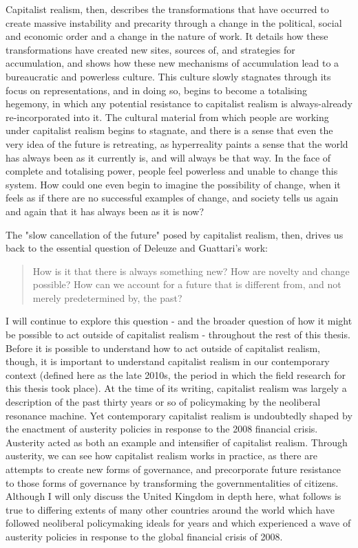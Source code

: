 Capitalist realism, then, describes the transformations that have occurred to create massive instability and precarity through a change in the political, social and economic order and a change in the nature of work. It details how these transformations have created new sites, sources of, and strategies for accumulation, and shows how these new mechanisms of accumulation lead to a bureaucratic and powerless culture. This culture slowly stagnates through its focus on representations, and in doing so, begins to become a totalising hegemony, in which any potential resistance to capitalist realism is always-already re-incorporated into it. The cultural material from which people are working under capitalist realism begins to stagnate, and there is a sense that even the very idea of the future is retreating, as hyperreality paints a sense that the world has always been as it currently is, and will always be that way. In the face of complete and totalising power, people feel powerless and unable to change this system. How could one even begin to imagine the possibility of change, when it feels as if there are no successful examples of change, and society tells us again and again that it has always been as it is now? 

The "slow cancellation of the future" \citep[5]{fisher_ghosts_2014} posed by capitalist realism, then, drives us back to the essential question of Deleuze and Guattari's work:

\begin{quote}
How is it that there is always something new? How are novelty and change possible? How can we account for a future that is different from, and not merely predetermined by, the past? \citep[23]{shaviro_deleuzes_2007} 
\end{quote}

I will continue to explore this question - and the broader question of how it might be possible to act outside of capitalist realism - throughout the rest of this thesis. Before it is possible to understand how to act outside of capitalist realism, though, it is important to understand capitalist realism in our contemporary context (defined here as the late 2010s, the period in which the field research for this thesis took place). At the time of its writing, capitalist realism was largely a description of the past thirty years or so of policymaking by the neoliberal resonance machine. Yet contemporary capitalist realism is undoubtedly shaped by the enactment of austerity policies in response to the 2008 financial crisis. Austerity acted as both an example and intensifier of capitalist realism. Through austerity, we can see how capitalist realism works in practice, as there are attempts to create new forms of governance, and precorporate future resistance to those forms of governance by transforming the governmentalities of citizens. Although I will only discuss the United Kingdom in depth here, what follows is true to differing extents of many other countries around the world which have followed neoliberal policymaking ideals for years and which experienced a wave of austerity policies in response to the global financial crisis of 2008.


